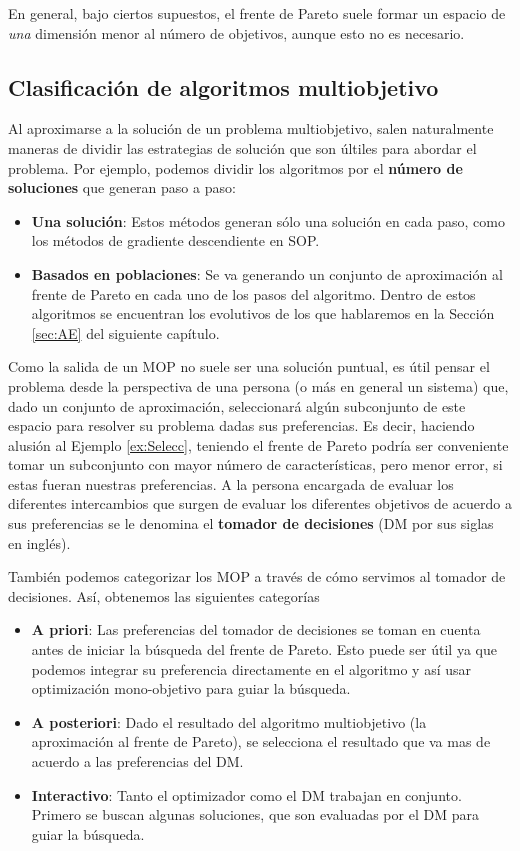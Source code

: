 En general, bajo ciertos supuestos, el frente de Pareto suele formar un espacio de \emph{una} dimensión menor al número de objetivos, aunque esto no es necesario.

\subsection{Clasificación de algoritmos multiobjetivo} \label{sec:clasif_MOO}

Al aproximarse a la solución de un problema multiobjetivo, salen naturalmente maneras de dividir las estrategias de solución que son últiles para abordar el problema. Por ejemplo, podemos dividir los algoritmos por el \textbf{número de soluciones} \cite{talbiMetaheuristicsDesignImplementation2009} que generan paso a paso:

\begin{itemize}
    \item \textbf{Una solución}: Estos métodos generan sólo una solución en cada paso, como los métodos de gradiente descendiente en SOP.
    \item \textbf{Basados en poblaciones}: Se va generando un conjunto de aproximación al frente de Pareto en cada uno de los pasos del algoritmo. Dentro de estos algoritmos se encuentran los evolutivos de los que hablaremos en la Sección \ref{sec:AE} del siguiente capítulo. 
\end{itemize}

Como la salida de un MOP no suele ser una solución puntual, es útil pensar el problema desde la perspectiva de una persona (o más en general un sistema) que, dado un conjunto de aproximación, seleccionará algún subconjunto de este espacio para resolver su problema dadas sus preferencias. Es decir, haciendo alusión al Ejemplo \ref{ex:Selecc}, teniendo el frente de Pareto podría ser conveniente tomar un subconjunto con mayor número de características, pero menor error, si estas fueran nuestras preferencias.  A la persona encargada de evaluar los diferentes intercambios que surgen de evaluar los diferentes objetivos de acuerdo a sus preferencias se le denomina el \textbf{tomador de decisiones} (DM por sus siglas en inglés). 

También podemos categorizar los MOP a través de cómo servimos al tomador de decisiones. Así, obtenemos las siguientes categorías

\begin{itemize}
    \item \textbf{A priori}: Las preferencias del tomador de decisiones se toman en cuenta antes de iniciar la búsqueda del frente de Pareto. Esto puede ser útil ya que podemos integrar su preferencia directamente en el algoritmo y así usar optimización mono-objetivo para guiar la búsqueda.
    \item \textbf{A posteriori}: Dado el resultado del algoritmo multiobjetivo (la aproximación al frente de Pareto), se selecciona el resultado que va mas de acuerdo a las preferencias del DM.
    \item \textbf{Interactivo}: Tanto el optimizador como el DM trabajan en conjunto. Primero se buscan algunas soluciones, que son evaluadas por el DM para guiar la búsqueda. 
\end{itemize}


